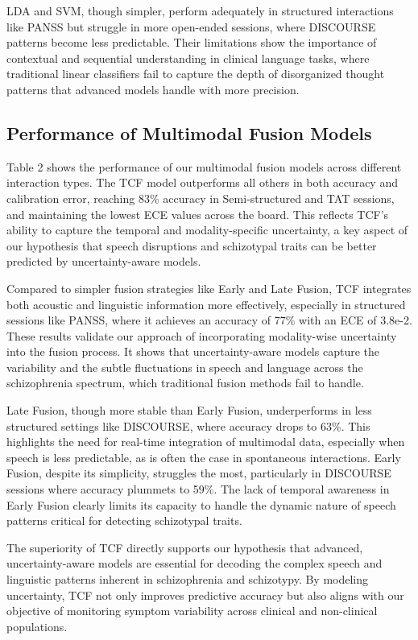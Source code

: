 \documentclass[9pt,a4paper]{rho-class/rho}
\begin{document}
LDA and SVM, though simpler, perform adequately in structured interactions like PANSS but struggle in more open-ended sessions, where DISCOURSE patterns become less predictable. Their limitations show the importance of contextual and sequential understanding in clinical language tasks, where traditional linear classifiers fail to capture the depth of disorganized thought patterns that advanced models handle with more precision. 



\subsection{Performance of Multimodal Fusion Models}

Table 2 shows the performance of our multimodal fusion models across different interaction types. The TCF model outperforms all others in both accuracy and calibration error, reaching 83\% accuracy in Semi-structured and TAT sessions, and maintaining the lowest ECE values across the board. This reflects TCF’s ability to capture the temporal and modality-specific uncertainty, a key aspect of our hypothesis that speech disruptions and schizotypal traits can be better predicted by uncertainty-aware models.

Compared to simpler fusion strategies like Early and Late Fusion, TCF integrates both acoustic and linguistic information more effectively, especially in structured sessions like PANSS, where it achieves an accuracy of 77\% with an ECE of 3.8e-2. These results validate our approach of incorporating modality-wise uncertainty into the fusion process. It shows that uncertainty-aware models capture the variability and the subtle fluctuations in speech and language across the schizophrenia spectrum, which traditional fusion methods fail to handle.

Late Fusion, though more stable than Early Fusion, underperforms in less structured settings like DISCOURSE, where accuracy drops to 63\%. This highlights the need for real-time integration of multimodal data, especially when speech is less predictable, as is often the case in spontaneous interactions. Early Fusion, despite its simplicity, struggles the most, particularly in DISCOURSE sessions where accuracy plummets to 59\%. The lack of temporal awareness in Early Fusion clearly limits its capacity to handle the dynamic nature of speech patterns critical for detecting schizotypal traits.

The superiority of TCF directly supports our hypothesis that advanced, uncertainty-aware models are essential for decoding the complex speech and linguistic patterns inherent in schizophrenia and schizotypy. By modeling uncertainty, TCF not only improves predictive accuracy but also aligns with our objective of monitoring symptom variability across clinical and non-clinical populations.
\end{document}
